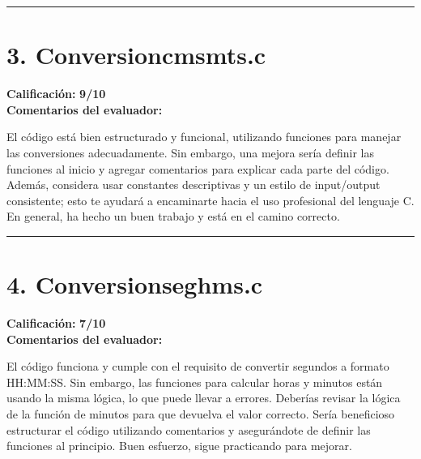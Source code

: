 \documentclass[11pt]{article}
\begin{document}
\vspace{0.5cm}
\hrule
\vspace{0.5cm}


\section*{\textbf{3.} Conversioncmsmts.c}

\begin{minipage}{\textwidth}
\textbf{Calificación:} \textcolor{commentgreen}{\textbf{9/10}}\\[0.3cm]

\textbf{Comentarios del evaluador:}\\[0.2cm]
\begin{minipage}{\textwidth}
\small
El código está bien estructurado y funcional, utilizando funciones para manejar las conversiones adecuadamente. Sin embargo, una mejora sería definir las funciones al inicio y agregar comentarios para explicar cada parte del código. Además, considera usar constantes descriptivas y un estilo de input/output consistente; esto te ayudará a encaminarte hacia el uso profesional del lenguaje C. En general, ha hecho un buen trabajo y está en el camino correcto.
\end{minipage}
\end{minipage}

\vspace{0.5cm}
\hrule
\vspace{0.5cm}


\section*{\textbf{4.} Conversionseghms.c}

\begin{minipage}{\textwidth}
\textbf{Calificación:} \textcolor{scoreorange}{\textbf{7/10}}\\[0.3cm]

\textbf{Comentarios del evaluador:}\\[0.2cm]
\begin{minipage}{\textwidth}
\small
El código funciona y cumple con el requisito de convertir segundos a formato HH:MM:SS. Sin embargo, las funciones para calcular horas y minutos están usando la misma lógica, lo que puede llevar a errores. Deberías revisar la lógica de la función de minutos para que devuelva el valor correcto. Sería beneficioso estructurar el código utilizando comentarios y asegurándote de definir las funciones al principio. Buen esfuerzo, sigue practicando para mejorar.
\end{minipage}
\end{minipage}
\end{document}
